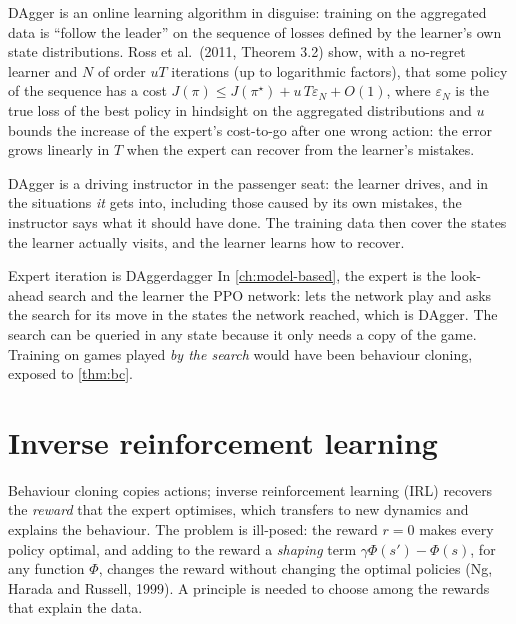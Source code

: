 DAgger is an online learning algorithm in disguise: training on the
aggregated data is ``follow the leader'' on the sequence of losses defined
by the learner's own state distributions. Ross et al.\ (2011, Theorem 3.2) show,
with a no-regret learner and $N$ of order $u T$ iterations (up to logarithmic
factors), that some policy of the sequence has a cost $J(\pi) \leq
J(\pi^\star) + u\, T \varepsilon_N + O(1)$, where $\varepsilon_N$ is the
true loss of the best policy in hindsight on the aggregated distributions and
$u$ bounds the increase of the expert's cost-to-go after one wrong action: the
error grows linearly in
$T$ when the expert can recover from the learner's mistakes.

\begin{intuition}
  DAgger is a driving instructor in the passenger seat: the learner
  drives, and in the situations \emph{it} gets into, including those
  caused by its own mistakes, the instructor says what it should have
  done. The training data then cover the states the learner actually
  visits, and the learner learns how to recover.
\end{intuition}

\begin{pacman}{Expert iteration is DAgger}{dagger}
  In \cref{ch:model-based}, the expert is the look-ahead search and the
  learner the PPO network:  lets the network play
  and asks the search for its move in the states the network reached, which
  is DAgger. The search can be queried in any state because it only needs
  a copy of the game. Training on games played \emph{by the search} would
  have been behaviour cloning, exposed to \cref{thm:bc}.
\end{pacman}

\section{Inverse reinforcement learning}

Behaviour cloning copies actions; inverse reinforcement learning (IRL)
recovers the \emph{reward} that the expert optimises, which transfers to new
dynamics and explains the behaviour. The problem is ill-posed: the reward
$r = 0$ makes every policy optimal, and adding to the reward a
\emph{shaping} term $\gamma \Phi(s') - \Phi(s)$, for any function $\Phi$,
changes the reward without changing the optimal policies (Ng, Harada and
Russell, 1999).
A principle is needed to choose among the rewards that explain the data.

